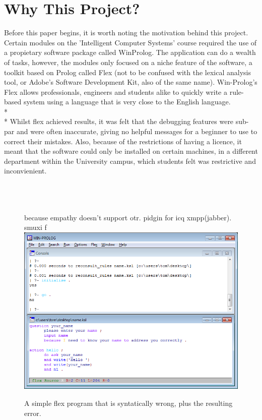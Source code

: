 \documentclass[12pt]{report}
\begin{document}
\section[Why This Project?]{Why This Project?}\label{sec:why_this_project}
Before this paper begins, it is worth noting the motivation behind this project.  Certain modules on the 'Intelligent Computer Systems' course required the use of a propietary software package called WinProlog.  The application can do a wealth of tasks, however, the modules only focused on a niche feature of the software, a toolkit based on Prolog called Flex (not to be confused with the lexical analysis tool, or Adobe's Software Development Kit, also of the same name).  Win-Prolog's Flex allows professionals, engineers and students alike to quickly write a rule-based system using a language that is very close to the English language.
\\*
\\*
Whilst flex achieved results, it was felt that the debugging features were sub-par and were often inaccurate, giving no helpful messages for a beginner to use to correct their mistakes.  Also, because of the restrictions of having a licence, it meant that the software could only be installed on certain machines, in a different department within the University campus, which students felt was restrictive and inconvienient.
\\
\\
\\
\\
\begin{figure}[h!]
	\centering because empathy doesn't support otr. pidgin for icq xmpp(jabber). smuxi f
		\includegraphics[scale=0.85]{flexfail}
		\caption{A simple flex program that is syntatically wrong, plus the resulting error.}
\end{figure}
\end{document}
